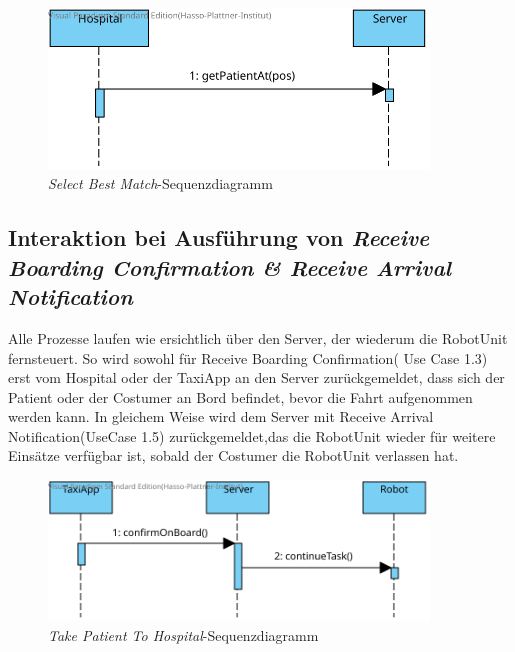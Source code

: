 \begin{figure}[H]
	\centering
	\includegraphics[width=0.9\textwidth]{img/2-Entwurf-RecieveOrder-Hosp.svg}
	\caption{\emph{Select Best Match}-Sequenzdiagramm}
	\label{SequenzDiagrammInteraktion}
\end{figure}



\subsection*{Interaktion bei Ausführung von \emph{Receive Boarding Confirmation \& Receive Arrival Notification}}

Alle Prozesse laufen wie ersichtlich über den Server, der wiederum die RobotUnit fernsteuert. So wird sowohl für Receive Boarding Confirmation( Use Case 1.3) erst vom Hospital oder der TaxiApp an den Server zurückgemeldet, dass sich der Patient oder der Costumer an Bord befindet, bevor die Fahrt aufgenommen werden kann. In gleichem Weise wird dem Server mit Receive Arrival Notification(UseCase 1.5) zurückgemeldet,das die RobotUnit wieder für weitere Einsätze verfügbar ist, sobald der Costumer die RobotUnit verlassen hat.  \\

\begin{figure}[H]
	\centering
	\includegraphics[width=0.9\textwidth]{img/2-Entwurf-ReceiveBoardingConfirmation-taxi.svg}
	\caption{\emph{Take Patient To Hospital}-Sequenzdiagramm}
	\label{SequenzDiagrammInteraktion}
\end{figure}

